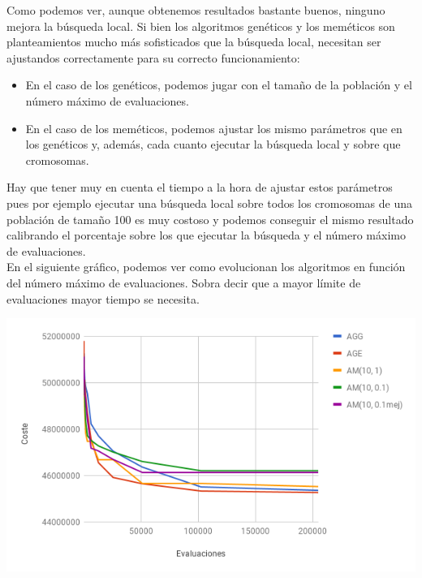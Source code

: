 \documentclass[a4paper, 12pt]{article}
\begin{document}
	Como podemos ver, aunque obtenemos resultados bastante buenos, ninguno mejora la búsqueda local. 
	Si bien los algoritmos genéticos y los meméticos son planteamientos mucho más sofisticados que la búsqueda local, necesitan ser ajustandos correctamente para su correcto funcionamiento:\\
	
	\begin{itemize}
		\item En el caso de los genéticos, podemos jugar con el tamaño de la población y el número máximo de evaluaciones.\\
	
		\item En el caso de los meméticos, podemos ajustar los mismo parámetros que en los genéticos y, además, cada cuanto ejecutar la búsqueda local y sobre que cromosomas.\\
	\end{itemize}
	
	Hay que tener muy en cuenta el tiempo a la hora de ajustar estos parámetros pues por ejemplo ejecutar una búsqueda local sobre todos los cromosomas de una población de tamaño 100 es muy costoso y podemos conseguir el mismo resultado calibrando el porcentaje sobre los que ejecutar la búsqueda y el número máximo de evaluaciones.\\
	
	\newpage
	En el siguiente gráfico, podemos ver como evolucionan los algoritmos en función del número máximo de evaluaciones. Sobra decir que a mayor límite de evaluaciones mayor tiempo se necesita.\\
	
	\begin{center}
         \includegraphics[scale=0.7]{evals-vs-coste}
      \end{center}
      
\end{document}
